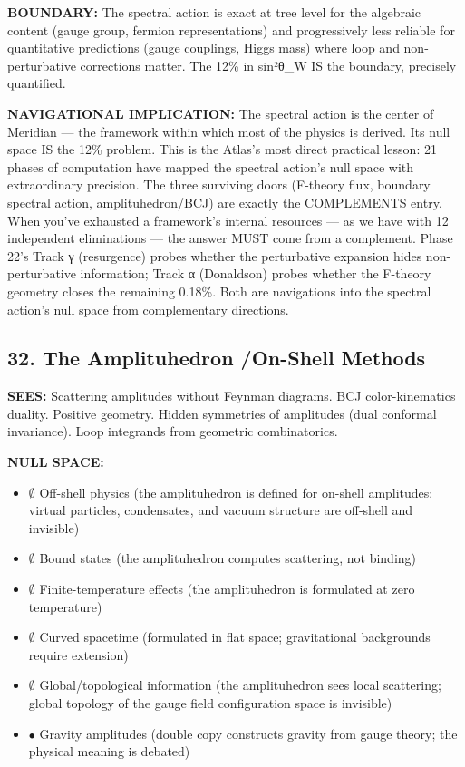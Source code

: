 \textbf{BOUNDARY:} The spectral action is exact at tree level for the algebraic content (gauge group, fermion representations) and progressively less reliable for quantitative predictions (gauge couplings, Higgs mass) where loop and non-perturbative corrections matter. The 12\% in sin²θ\_W IS the boundary, precisely quantified.


\textbf{NAVIGATIONAL IMPLICATION:} The spectral action is the center of Meridian — the framework within which most of the physics is derived. Its null space IS the 12\% problem. This is the Atlas's most direct practical lesson: 21 phases of computation have mapped the spectral action's null space with extraordinary precision. The three surviving doors (F-theory flux, boundary spectral action, amplituhedron/\allowbreak BCJ) are exactly the COMPLEMENTS entry. When you've exhausted a framework's internal resources — as we have with 12 independent eliminations — the answer MUST come from a complement. Phase 22's Track γ (resurgence) probes whether the perturbative expansion hides non-perturbative information; Track α (Donaldson) probes whether the F-theory geometry closes the remaining 0.18\%. Both are navigations into the spectral action's null space from complementary directions.


\bigskip\noindent\makebox[\textwidth]{\color{rulegray}\rule{5cm}{0.3pt}}\bigskip


\subsection*{32. The Amplituhedron /\allowbreak  On-Shell Methods}


\textbf{SEES:} Scattering amplitudes without Feynman diagrams. BCJ color-kinematics duality. Positive geometry. Hidden symmetries of amplitudes (dual conformal invariance). Loop integrands from geometric combinatorics.


\textbf{NULL SPACE:}

\begin{itemize}[nosep,leftmargin=*]
  \item $\emptyset$ Off-shell physics (the amplituhedron is defined for on-shell amplitudes; virtual particles, condensates, and vacuum structure are off-shell and invisible)
  \item $\emptyset$ Bound states (the amplituhedron computes scattering, not binding)
  \item $\emptyset$ Finite-temperature effects (the amplituhedron is formulated at zero temperature)
  \item $\emptyset$ Curved spacetime (formulated in flat space; gravitational backgrounds require extension)
  \item $\emptyset$ Global/\allowbreak topological information (the amplituhedron sees local scattering; global topology of the gauge field configuration space is invisible)
  \item $\bullet$ Gravity amplitudes (double copy constructs gravity from gauge theory; the physical meaning is debated)
\end{itemize}


